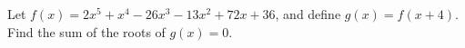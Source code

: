 Let $f(x)=2x^5+x^4-26x^3-13x^2+72x+36$, and define $g(x)=f(x+4)$. Find the sum of the roots of $g(x)=0$.
